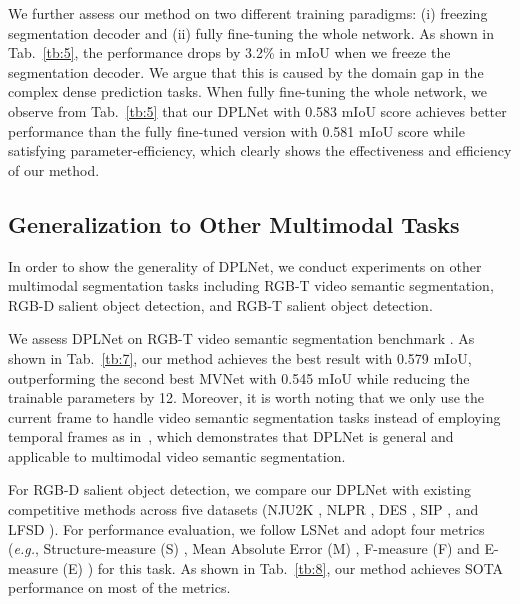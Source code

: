 \documentclass[10pt,twocolumn,letterpaper]{article}
\begin{document}
\vspace{0.2em}
 We further assess our method on two different training paradigms: (i) freezing segmentation decoder and (ii) fully fine-tuning the whole network. As shown in Tab.~\ref{tb:5}, the performance drops by 3.2\% in mIoU when we freeze the segmentation decoder. We argue that this is caused by the domain gap in the complex dense prediction tasks. When fully fine-tuning the whole network, we observe from Tab.~\ref{tb:5} that our DPLNet with 0.583 mIoU score achieves better performance than the fully fine-tuned version with 0.581 mIoU score while satisfying parameter-efficiency, which clearly shows the effectiveness and efficiency of our method.






\subsection{Generalization to Other Multimodal Tasks}
\label{4.4}
In order to show the generality of DPLNet, we conduct experiments on other multimodal segmentation tasks including RGB-T video semantic segmentation, RGB-D salient object detection, and RGB-T salient object detection.

\vspace{0.2em}
 We assess DPLNet on RGB-T video semantic segmentation benchmark \cite{MVNet}. As shown in Tab.~\ref{tb:7}, our method achieves the best result with 0.579 mIoU, outperforming the second best MVNet with 0.545 mIoU while reducing the trainable parameters by 12. Moreover, it is worth noting that we only use the current frame to handle video semantic segmentation tasks instead of employing temporal frames as in~\cite{MVNet}, which demonstrates that DPLNet is general and applicable to multimodal video semantic segmentation.

\vspace{0.2em}
 For RGB-D salient object detection, we compare our DPLNet with existing competitive methods across five datasets (NJU2K \cite{(NJU2K}, NLPR \cite{NLPR}, DES \cite{DES}, SIP \cite{SIP}, and LFSD \cite{LFSD}). For performance evaluation, we follow LSNet \cite{LSNet} and adopt four metrics (\textit{e.g.}, Structure-measure (S) \cite{structuremeature}, Mean Absolute Error (M) \cite{MAEmeasure}, F-measure (F) \cite{Fmeasure} and E-measure (E) \cite{Emeasure}) for this task. As shown in Tab.~\ref{tb:8}, our method achieves SOTA performance on most of the metrics.
\end{document}
